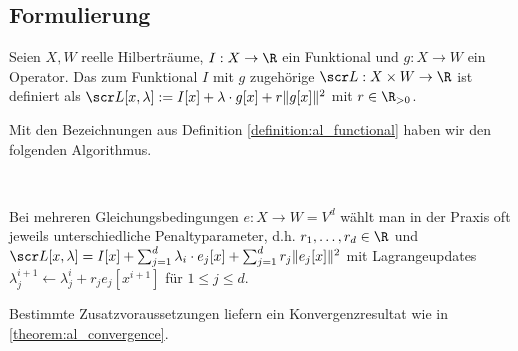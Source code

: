 \documentclass{mythesis}
\begin{document}
\subsection*{Formulierung}


\begin{definition} \label{definition:al_functional}
    Seien $X, W$ reelle Hilberträume, $I: X \to \R$ ein Funktional und $g: X \to W$ ein Operator.
    Das zum Funktional $I$ mit  $g$ zugehörige  $\scr L: X \times W \to \R$
    ist definiert als
    \begin{math}
	\scr L[x,\lambda] := I[x] + \lambda \cdot g[x] + r \|g[x]\|^2
    \end{math}
    mit  $r \in \R_{>0}$.
\end{definition}


\begin{algorithm} \label{alg:augmented_lagrange}
    Mit den Bezeichnungen aus Definition \ref{definition:al_functional} haben wir den folgenden Algorithmus.

    \begin{samepage}
	\\
	\begin{algorithmic}
	    \EndFor
	\end{algorithmic}
    \end{samepage}
    \begin{note}
	Bei mehreren Gleichungsbedingungen $e: X \to W = V^d$ wählt man in der Praxis oft jeweils unterschiedliche Penaltyparameter, d.h. $r_1, \dotsc, r_d \in \R$ und
	\begin{math}
	    \scr L[x, \lambda] = I[x] + \sum_{j=1}^d \lambda_i \cdot e_j[x] + \sum_{j=1}^d r_j \|e_j[x]\|^2
	\end{math}
	mit Lagrangeupdates $\lambda^{i+1}_j \gets \lambda^i_j + r_j e_j[x^{i+1}]$ für $1 \le j \le d$.
    \end{note}
\end{algorithm}

Bestimmte Zusatzvoraussetzungen liefern ein Konvergenzresultat wie in \ref{theorem:al_convergence}.
\end{document}
